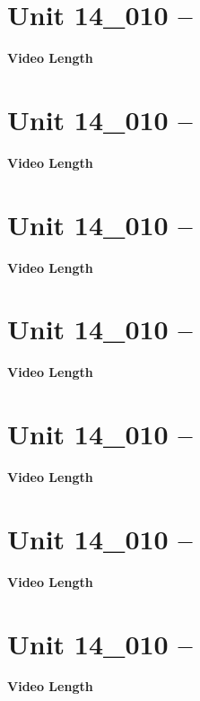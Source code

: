 \documentclass[letterpaper,12pt]{exam}
\newcommand{\unit}{Unit 14}
\begin{document}
\begin{questions}

\section*{\unit\_010 -- } 
\par{\selectfont\textbf{Video Length }}


\section*{\unit\_010 -- } 
\par{\selectfont\textbf{Video Length }}


\section*{\unit\_010 -- } 
\par{\selectfont\textbf{Video Length }}


\section*{\unit\_010 -- } 
\par{\selectfont\textbf{Video Length }}


\section*{\unit\_010 -- } 
\par{\selectfont\textbf{Video Length }}


\section*{\unit\_010 -- } 
\par{\selectfont\textbf{Video Length }}


\section*{\unit\_010 -- } 
\par{\selectfont\textbf{Video Length }}


\end{questions}
\end{document}

